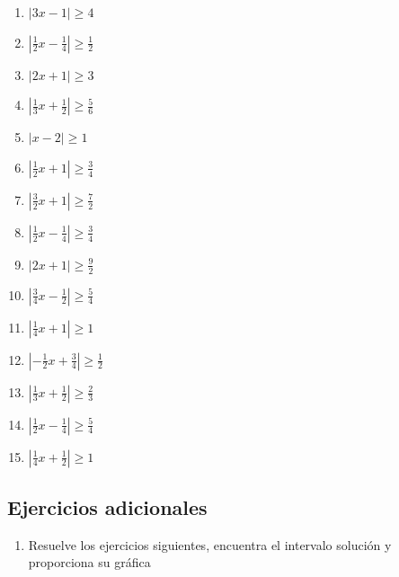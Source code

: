 \documentclass[12pt]{article}
\theoremstyle{plain}
\theoremstyle{definition}
\theoremstyle{remark}
\begin{document}
{\begin{enumerate}
\def\labelenumi{\arabic{enumi}.}
\item
  \(|3x-1|\geq 4\)
\item
  \(|\frac{1}{2}x-\frac{1}{4}|\geq\frac{1}{2}\)
\item
  \(|2x+1|\geq 3\)
\item
  \(|\frac{1}{3}x+\frac{1}{2}|\geq\frac{5}{6}\)
\item
  \(|x-2|\geq 1\)
\item
  \(|\frac{1}{2}x+1|\geq\frac{3}{4}\)
\item
  \(|\frac{3}{2}x+1|\geq\frac{7}{2}\)
\item
  \(|\frac{1}{2}x-\frac{1}{4}|\geq\frac{3}{4}\)
\item
  \(|2x+1|\geq\frac{9}{2}\)
\item
  \(|\frac{3}{4}x-\frac{1}{2}|\geq\frac{5}{4}\)
\item
  \(|\frac{1}{4}x+1|\geq 1\)
\item
  \(|-\frac{1}{2}x+\frac{3}{4}|\geq\frac{1}{2}\)
\item
  \(|\frac{1}{3}x+\frac{1}{2}|\geq\frac{2}{3}\)
\item
  \(|\frac{1}{2}x-\frac{1}{4}|\geq\frac{5}{4}\)
\item
  \(|\frac{1}{4}x+\frac{1}{2}|\geq 1\)
\end{enumerate}

\subsection{Ejercicios adicionales}

\begin{enumerate}
\def\labelenumi{\arabic{enumi}.}
\item
  Resuelve los ejercicios siguientes, encuentra el intervalo solución y
  proporciona su gráfica


\end{enumerate}}
\end{document}
